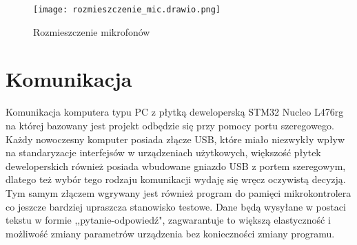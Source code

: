 
\begin{figure}[ht!]
    \centering
    \texttt{[image: rozmieszczenie\_mic.drawio.png]}
    \caption{Rozmieszczenie mikrofonów}
    \label{fig:rozmieszczenie_mic}
\end{figure}

\section{Komunikacja}
Komunikacja komputera typu PC z płytką deweloperską STM32 Nucleo L476rg na której bazowany jest projekt odbędzie się przy pomocy portu szeregowego. 
Każdy nowoczesny komputer posiada złącze USB, które miało niezwykły wpływ na standaryzacje interfejsów w urządzeniach użytkowych, 
większość płytek deweloperskich również posiada wbudowane gniazdo USB z portem szeregowym, dlatego też wybór tego rodzaju komunikacji wydaję się wręcz oczywistą decyzją.
Tym samym złączem wgrywany jest również program do pamięci mikrokontrolera co jeszcze bardziej upraszcza stanowisko testowe.
Dane będą wysyłane w postaci tekstu w formie ,,pytanie-odpowiedź", zagwarantuje to większą elastyczność i możliwość zmiany parametrów urządzenia bez konieczności zmiany programu. 





